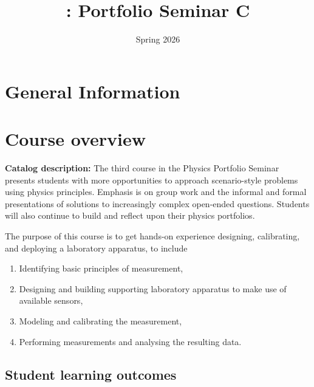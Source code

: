 \documentclass{syllabus}
\begin{document}
\thispagestyle{fancy}
\date{Spring 2026}
\author{}
\title{\coursecode: {Portfolio Seminar C}}
\maketitle



\section*{General Information}

\infotableport





\section*{Course overview}

\textbf{Catalog description:} The third course in the Physics Portfolio Seminar presents students with more opportunities to approach scenario-style problems using physics principles. Emphasis is on group work and the informal and formal presentations of solutions to increasingly complex open-ended questions. Students will also continue to build and reflect upon their physics portfolios.


The purpose of this course is to get hands-on experience designing, calibrating, and deploying a laboratory apparatus, to include
\begin{enumerate}
    \item Identifying basic principles of measurement,
    \item Designing and building supporting laboratory apparatus to make use of available sensors,
    \item Modeling and calibrating the measurement,
    \item Performing measurements and analysing the resulting data.
\end{enumerate}




\subsection*{Student learning outcomes} 
\noindent
\end{document}
